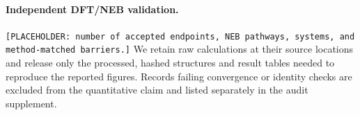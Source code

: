 \paragraph{Independent DFT/NEB validation.}
\texttt{[PLACEHOLDER: number of accepted endpoints, NEB pathways, systems,
and method-matched barriers.]}
We retain raw calculations at their source locations and release only the
processed, hashed structures and result tables needed to reproduce the reported
figures. Records failing convergence or identity checks are excluded from the
quantitative claim and listed separately in the audit supplement.
